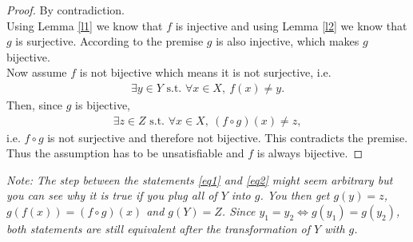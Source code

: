 \documentclass{article}
\newcommand{\st}{\text{ s.t. }}
\begin{document}
\begin{proof}
  By contradiction.\\
  Using Lemma \ref{l1} we know that $f$ is injective and using Lemma \ref{l2} we know that $g$ is surjective.
  According to the premise $g$ is also injective, which makes $g$ bijective.\\
  Now assume $f$ is not bijective which means it is not surjective, i.e.
  \begin{align}
    \label{eq1}
    \exists y \in Y \st \forall x \in X,\: f(x)\not= y.
  \end{align}
  Then, since $g$ is bijective,
  \begin{align}
    \label{eq2}
    \exists z \in Z \st \forall x \in X,\: \left(f\circ g\right)(x)\not= z,
  \end{align}
  i.e. $f\circ g$ is not surjective and therefore not bijective.
  This contradicts the premise.
  Thus the assumption has to be unsatisfiable and $f$ is always bijective.
\end{proof}
\emph{Note: The step between the statements \ref{eq1} and \ref{eq2} might seem arbitrary but you can see why it is true if you plug all of $Y$ into $g$.
You then get $g(y)=z$, $g(f(x))=(f\circ g)(x)$ and $g(Y)=Z$. Since $y_1=y_2\Leftrightarrow g(y_1)=g(y_2)$, both statements are still equivalent after the transformation of $Y$ with $g$.}
\end{document}
